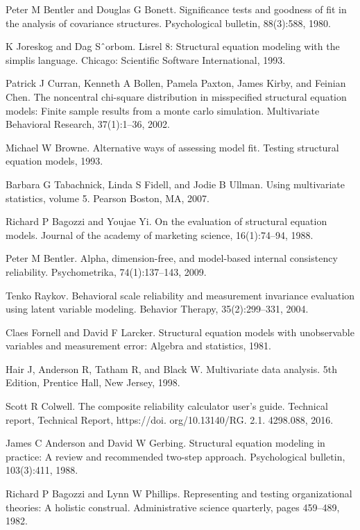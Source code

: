 \documentclass[letterpaper,12pt,titlepage,oneside,final,a4j,dvipdfmx]{book}
\begin{document}
\begin{thebibliography}{70}
  Peter M Bentler and Douglas G Bonett. Significance tests and goodness of fit in the analysis of covariance structures. Psychological bulletin, 88(3):588, 1980.

 K Joreskog and Dag Sˆorbom. Lisrel 8: Structural equation modeling with the simplis language. Chicago: Scientific Software International, 1993.

 Patrick J Curran, Kenneth A Bollen, Pamela Paxton, James Kirby, and Feinian Chen. The noncentral chi-square distribution in misspecified structural equation models: Finite sample results from a monte carlo simulation. Multivariate Behavioral Research, 37(1):1–36, 2002.

  Michael W Browne. Alternative ways of assessing model fit. Testing structural equation models, 1993.

 Barbara G Tabachnick, Linda S Fidell, and Jodie B Ullman. Using multivariate statistics, volume 5. Pearson Boston, MA, 2007.

  Richard P Bagozzi and Youjae Yi. On the evaluation of structural equation models. Journal of the academy of marketing science, 16(1):74–94, 1988.



 Peter M Bentler. Alpha, dimension-free, and model-based internal consistency reliability. Psychometrika, 74(1):137–143, 2009.

 Tenko Raykov. Behavioral scale reliability and measurement invariance evaluation using latent variable modeling. Behavior Therapy, 35(2):299–331, 2004.

  Claes Fornell and David F Larcker. Structural equation models with unobservable variables and measurement error: Algebra and statistics, 1981.

  Hair J, Anderson R, Tatham R, and Black W. Multivariate data analysis. 5th Edition, Prentice Hall, New Jersey, 1998.

 Scott R Colwell. The composite reliability calculator user's guide. Technical report, Technical Report, https://doi. org/10.13140/RG. 2.1. 4298.088, 2016.


 James C Anderson and David W Gerbing. Structural equation modeling in practice: A review and recommended two-step approach. Psychological bulletin, 103(3):411, 1988.


  Richard P Bagozzi and Lynn W Phillips. Representing and testing organizational theories: A holistic construal. Administrative science quarterly, pages 459–489, 1982.



\end{thebibliography}
\end{document}
